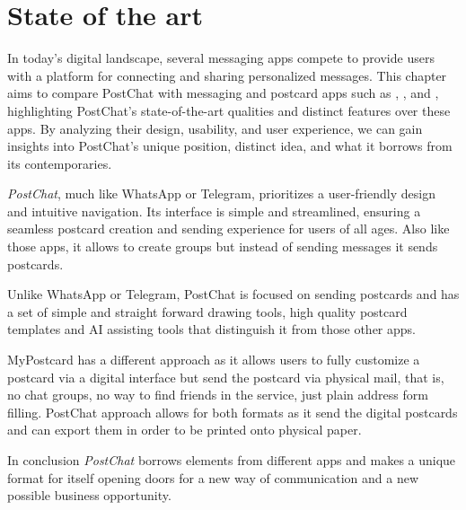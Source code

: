 
\chapter{State of the art} 
\label{ch:Chapter2}
\vfill \newpage

In today's digital landscape, several messaging apps compete to provide users with a platform for connecting and sharing personalized messages. This chapter aims to compare PostChat with messaging and postcard apps such as \textit{\cite{WhatsApp}}, \textit{\cite{Telegram}}, and \textit{\cite{MyPostcard}}, highlighting PostChat's state-of-the-art qualities and distinct features over these apps. By analyzing their design, usability, and user experience, we can gain insights into PostChat's unique position, distinct idea, and what it borrows from its contemporaries.


\textit{PostChat}, much like WhatsApp or Telegram, prioritizes a user-friendly design and intuitive navigation. Its interface is simple and streamlined, ensuring a seamless postcard creation and sending experience for users of all ages. Also like those apps, it allows to create groups but instead of sending messages it sends postcards.

Unlike WhatsApp or Telegram, PostChat is focused on sending postcards and has a set of simple and straight forward drawing tools, high quality postcard templates and AI assisting tools that distinguish it from those other apps. 

MyPostcard has a different approach as it allows users to fully customize a postcard via a digital interface but send the postcard via physical mail, that is, no chat groups, no way to find friends in the service, just plain address form filling. PostChat approach allows for both formats as it send the digital postcards and can export them in order to be printed onto physical paper.

In conclusion \textit{PostChat} borrows elements from different apps and makes a unique 
format for itself opening doors for a new way of communication and a new possible business 
opportunity.